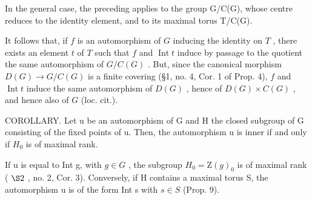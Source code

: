 In the general case, the preceding applies to the group G/C(G), whose centre reduces to the identity element, and to its maximal torus T/C(G).

It follows that, if \(f\) is an automorphism of \(G\) inducing the identity on \(T\) , there exists an element \(t\) of \(T\) such that \(f\) and \(\operatorname{Int} t\) induce by passage to the quotient the same automorphism of \(G / C(G)\) . But, since the canonical morphism \(D(G) \to G / C(G)\) is a finite covering (§1, no. 4, Cor. 1 of Prop. 4), \(f\) and \(\operatorname{Int} t\) induce the same automorphism of \(D(G)\) , hence of \(D(G) \times C(G)\) , and hence also of \(G\) (loc. cit.).

COROLLARY. Let u be an automorphism of G and H the closed subgroup of G consisting of the fixed points of u. Then, the automorphism u is inner if and only if \(H_{0}\) is of maximal rank.

If u is equal to Int g, with \(g \in G\) , the subgroup \(H_{0} = \mathrm{Z}(g)_{0}\) is of maximal rank ( \(\S2\) , no. 2, Cor. 3). Conversely, if H contains a maximal torus S, the automorphism u is of the form Int s with \(s \in S\) (Prop. 9).